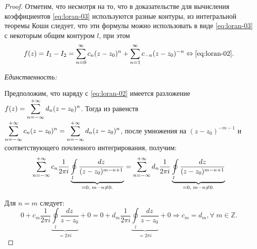 \begin{proof}
  Отметим, что несмотря на то, что в доказательстве для вычисления коэффициентов \eqref{eq:loran-03} используются
  разные контуры, из интегральной теоремы Коши следует, что эти формулы
  можно использовать в виде \eqref{eq:loran-03} с некоторым общим контуром $ l $, при этом
  \begin{equation*}
    f(z) = I_1 - I_2 = \sum\limits_{n=0}^{\infty} c_n (z-z_0)^n + \sum_{n=1}^{\infty} c_{-n} (z-z_0)^{-n} \Leftrightarrow \eqref{eq:loran-02}.
  \end{equation*}

  \noindent\textit{Единственность:}

  Предположим, что наряду с \eqref{eq:loran-02} имеется разложение $ f(z) = \displaystyle\sum_{n=-\infty}^{+\infty} d_n (z-z_0)^n $.
  Тогда из равенств $ \displaystyle\sum_{n=-\infty}^{+\infty} c_n (z-z_0)^n = \displaystyle\sum_{n=-\infty}^{+\infty} d_n (z-z_0)^n  $, после умножения на $ (z-z_0)^{-m-1} $ и соответствующего почленного интегрирования, получим:
  \begin{equation*}
    \displaystyle\sum_{n=-\infty}^{+\infty} c_n \dfrac{1}{2 \pi i}
    \underbrace{\oint\limits_l \dfrac{dz}{(z-z_0)^{m-n+1}} }_{
      =0, \; m-n \neq 0.
    }
    =
    \displaystyle\sum_{n=-\infty}^{+\infty} d_n \dfrac{1}{2 \pi i}
    \underbrace{\oint\limits_l \dfrac{dz}{(z-z_0)^{m-n+1}} }_{
      =0, \; m-n \neq 0.
    }
  \end{equation*}

  Для $ n = m $ следует:
  \begin{equation*}
    0 + c_m \dfrac{1}{2 \pi i}
    \underbrace{\oint\limits_l \dfrac{dz}{z-z_0} }_{
      =2 \pi i
    }
    + 0
    =
    0 + d_m \dfrac{1}{2 \pi i}
    \underbrace{\oint\limits_l \dfrac{dz}{z-z_0} }_{
      =2 \pi i
    }
    + 0
    \Rightarrow c_m = d_m, \forall \; m \in \mathbb{Z}.
  \end{equation*}

\end{proof}
